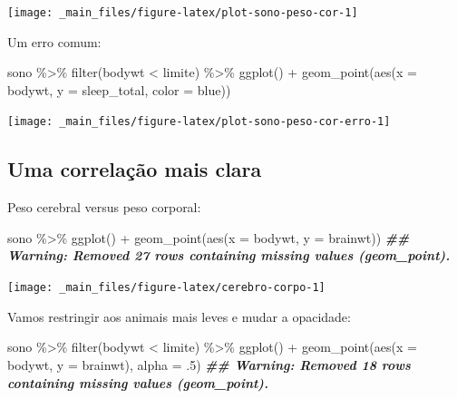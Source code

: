 \documentclass[
  12pt]{report}
\newenvironment{Shaded}{\begin{snugshade}}{\end{snugshade}}
\newcommand{\AttributeTok}[1]{\textcolor[rgb]{0.77,0.63,0.00}{#1}}
\newcommand{\DecValTok}[1]{\textcolor[rgb]{0.00,0.00,0.81}{#1}}
\newcommand{\DocumentationTok}[1]{\textcolor[rgb]{0.56,0.35,0.01}{\textbf{\textit{#1}}}}
\newcommand{\FunctionTok}[1]{\textcolor[rgb]{0.00,0.00,0.00}{#1}}
\newcommand{\NormalTok}[1]{#1}
\newcommand{\SpecialCharTok}[1]{\textcolor[rgb]{0.00,0.00,0.00}{#1}}
\newcommand{\StringTok}[1]{\textcolor[rgb]{0.31,0.60,0.02}{#1}}
\begin{document}
\begin{center}\texttt{[image: \_main\_files/figure-latex/plot-sono-peso-cor-1]} \end{center}

Um erro comum:

\begin{Shaded}
\begin{Highlighting}[]
\NormalTok{sono }\SpecialCharTok{\%\textgreater{}\%} 
  \FunctionTok{filter}\NormalTok{(bodywt }\SpecialCharTok{\textless{}}\NormalTok{ limite) }\SpecialCharTok{\%\textgreater{}\%} 
  \FunctionTok{ggplot}\NormalTok{() }\SpecialCharTok{+}
    \FunctionTok{geom\_point}\NormalTok{(}\FunctionTok{aes}\NormalTok{(}\AttributeTok{x =}\NormalTok{ bodywt, }\AttributeTok{y =}\NormalTok{ sleep\_total, }\AttributeTok{color =} \StringTok{\textquotesingle{}blue\textquotesingle{}}\NormalTok{))}
\end{Highlighting}
\end{Shaded}

\begin{center}\texttt{[image: \_main\_files/figure-latex/plot-sono-peso-cor-erro-1]} \end{center}

\hypertarget{uma-correlauxe7uxe3o-mais-clara}{%
\subsection{Uma correlação mais clara}\label{uma-correlauxe7uxe3o-mais-clara}}

Peso cerebral versus peso corporal:

\begin{Shaded}
\begin{Highlighting}[]
\NormalTok{sono }\SpecialCharTok{\%\textgreater{}\%} 
  \FunctionTok{ggplot}\NormalTok{() }\SpecialCharTok{+}
    \FunctionTok{geom\_point}\NormalTok{(}\FunctionTok{aes}\NormalTok{(}\AttributeTok{x =}\NormalTok{ bodywt, }\AttributeTok{y =}\NormalTok{ brainwt))}
\DocumentationTok{\#\# Warning: Removed 27 rows containing missing values (geom\_point).}
\end{Highlighting}
\end{Shaded}

\begin{center}\texttt{[image: \_main\_files/figure-latex/cerebro-corpo-1]} \end{center}

Vamos restringir aos animais mais leves e mudar a opacidade:

\begin{Shaded}
\begin{Highlighting}[]
\NormalTok{sono }\SpecialCharTok{\%\textgreater{}\%} 
  \FunctionTok{filter}\NormalTok{(bodywt }\SpecialCharTok{\textless{}}\NormalTok{ limite) }\SpecialCharTok{\%\textgreater{}\%} 
  \FunctionTok{ggplot}\NormalTok{() }\SpecialCharTok{+}
    \FunctionTok{geom\_point}\NormalTok{(}\FunctionTok{aes}\NormalTok{(}\AttributeTok{x =}\NormalTok{ bodywt, }\AttributeTok{y =}\NormalTok{ brainwt), }\AttributeTok{alpha =}\NormalTok{ .}\DecValTok{5}\NormalTok{)}
\DocumentationTok{\#\# Warning: Removed 18 rows containing missing values (geom\_point).}
\end{Highlighting}
\end{Shaded}
\end{document}
